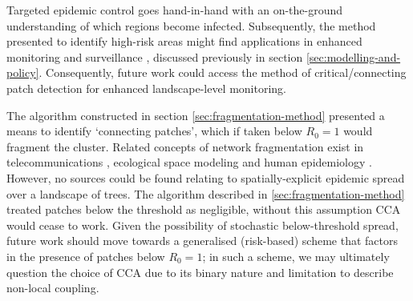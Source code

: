 Targeted epidemic control goes hand-in-hand with an on-the-ground understanding of which regions become infected.
Subsequently, the method presented to identify high-risk areas might find applications in enhanced monitoring and surveillance \cite{surveillance-review}, discussed previously in section \ref{sec:modelling-and-policy}. Consequently, future work could access the method of critical/connecting patch detection for enhanced landscape-level monitoring.

The algorithm constructed in section \ref{sec:fragmentation-method} presented a means to identify `connecting patches', which if taken below $R_0=1$ would fragment the cluster.
Related concepts of network fragmentation exist in telecommunications \cite{albert2000error}, ecological space modeling \cite{luo2021understanding} and human epidemiology \cite{chami2017social}.
However, no sources could be found relating to spatially-explicit epidemic spread over a landscape of trees.
The algorithm described in \ref{sec:fragmentation-method} treated patches below the threshold as negligible, without this assumption CCA would cease to work.
Given the possibility of stochastic below-threshold spread, future work should move towards a generalised (risk-based) scheme that factors in the presence of patches below $R_0=1$;
in such a scheme, we may ultimately question the choice of CCA due to its binary nature and limitation to describe non-local coupling.






